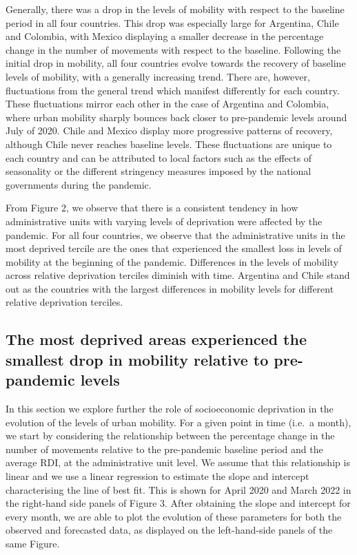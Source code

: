 \documentclass[
  11pt,
]{article}
\begin{document}
Generally, there was a drop in the levels of mobility with respect to
the baseline period in all four countries. This drop was especially
large for Argentina, Chile and Colombia, with Mexico displaying a
smaller decrease in the percentage change in the number of movements
with respect to the baseline. Following the initial drop in mobility,
all four countries evolve towards the recovery of baseline levels of
mobility, with a generally increasing trend. There are, however,
fluctuations from the general trend which manifest differently for each
country. These fluctuations mirror each other in the case of Argentina
and Colombia, where urban mobility sharply bounces back closer to
pre-pandemic levels around July of 2020. Chile and Mexico display more
progressive patterns of recovery, although Chile never reaches baseline
levels. These fluctuations are unique to each country and can be
attributed to local factors such as the effects of seasonality or the
different stringency measures imposed by the national governments during
the pandemic.

From Figure 2, we observe that there is a consistent tendency in how
administrative units with varying levels of deprivation were affected by
the pandemic. For all four countries, we observe that the administrative
units in the most deprived tercile are the ones that experienced the
smallest loss in levels of mobility at the beginning of the pandemic.
Differences in the levels of mobility across relative deprivation
terciles diminish with time. Argentina and Chile stand out as the
countries with the largest differences in mobility levels for different
relative deprivation terciles.

\hypertarget{the-most-deprived-areas-experienced-the-smallest-drop-in-mobility-relative-to-pre-pandemic-levels}{%
\subsection{The most deprived areas experienced the smallest drop in
mobility relative to pre-pandemic
levels}\label{the-most-deprived-areas-experienced-the-smallest-drop-in-mobility-relative-to-pre-pandemic-levels}}

In this section we explore further the role of socioeconomic deprivation
in the evolution of the levels of urban mobility. For a given point in
time (i.e.~a month), we start by considering the relationship between
the percentage change in the number of movements relative to the
pre-pandemic baseline period and the average RDI, at the administrative
unit level. We assume that this relationship is linear and we use a
linear regression to estimate the slope and intercept characterising the
line of best fit. This is shown for April 2020 and March 2022 in the
right-hand side panels of Figure 3. After obtaining the slope and
intercept for every month, we are able to plot the evolution of these
parameters for both the observed and forecasted data, as displayed on
the left-hand-side panels of the same Figure.
\end{document}
